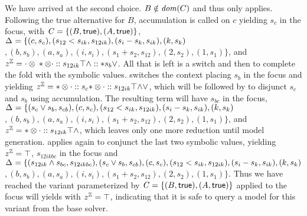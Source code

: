 We have arrived at the second choice. $B \notin \dom{C}$ and thus only \crChc
applies. Following the true alternative for $B$, accumulation is called on $c$
yielding $s_{c}$ in the focus, with $\configuration = \set{(B,\true),
  (A,\true)}$, $\aStore{}=\{(c,s_{c}),(s_{12} < s_{ik}, s_{12ik}),(s_{i} -
s_{k}, s_{ik}),(k,s_{k})$ $ ,(b, s_{b}), (a,s_{a}),(i, s_{i}),(s_{1} + s_{2},
s_{12}), (2,s_{2}), (1,s_{1})\}$, and $\zipper =
\inBoolL*{\inBoolR*{s_{12ik}}{\inRoot{}}{\wedge}}{s_{b}}{\vee}$. All that is
left is a switch and then to complete the fold with the symbolic values.
\crBoolL{} switches the context placing $s_{b}$ in the focus and yielding
$\zipper = \inBoolR*{s_{c}}{\inBoolR*{s_{12ik}}{\inRoot{}}{\wedge}}{\vee}$,
which will be followed by \crBoolR{} to disjunct $s_{c}$ and $s_{b}$ using
accumulation. The resulting term will have $s_{bc}$ in the focus,
$\aStore{}=\{(s_{c} \vee s_{b}, s_{cb}),(c,s_{c}),(s_{12} < s_{ik},
s_{12ik}),(s_{i} - s_{k}, s_{ik}),(k,s_{k})$ $ ,(b, s_{b}), (a,s_{a}),(i,
s_{i}),(s_{1} + s_{2}, s_{12}), (2,s_{2}), (1,s_{1})\}$, and $\zipper =
\inBoolR*{s_{12ik}}{\inRoot{}}{\wedge}$, which leaves only one more reduction
until model generation. \crBoolR{} applies again to conjunct the last two
symbolic values, yielding $\zipper = \inRoot{}$, $s_{12ikbc}$ in the focus and
$\aStore{}=\{(s_{12ik} \wedge s_{bc}, s_{12ikbc}), (s_{c} \vee s_{b},
s_{cb}),(c,s_{c}),(s_{12} < s_{ik}, s_{12ik}),(s_{i} - s_{k}, s_{ik}),(k,s_{k})$
$ ,(b, s_{b}), (a,s_{a}),(i, s_{i}),(s_{1} + s_{2}, s_{12}), (2,s_{2}),
(1,s_{1})\}$. Thus we have reached the variant parameterized by
$\configuration=\set{(B,\true),(A,\true)}$ \evSym{} applied to the focus will
yields \unit{} with $\zipper = \inRoot{}$, indicating that it is safe to query a
model for this variant from the base solver.


